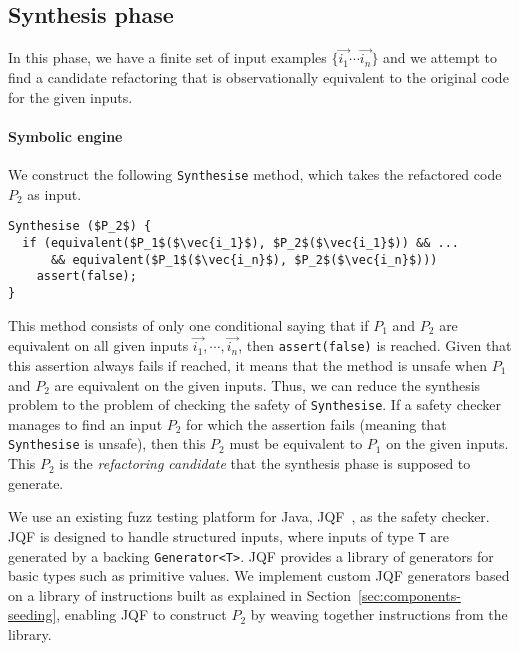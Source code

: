 \documentclass[conference]{IEEEtran}
\begin{document}

\subsection{Synthesis phase}\label{sec:synthesis}
In this phase, we have 
a finite set of input examples $\{\vec{i_1} \cdots \vec{i_n}\}$ and we attempt to find a candidate refactoring
that is observationally equivalent to the original code for the given inputs.

\paragraph{Symbolic engine}
We construct the following \lstinline[breaklines=true]{Synthesise} method, which
takes the refactored code $P_2$ as input.

\begin{lstlisting}[mathescape=true,showstringspaces=false,numbers=none]
Synthesise ($P_2$) {
  if (equivalent($P_1$($\vec{i_1}$), $P_2$($\vec{i_1}$)) && ...
      && equivalent($P_1$($\vec{i_n}$), $P_2$($\vec{i_n}$)))
    assert(false);
}
\end{lstlisting}

This method consists of only one conditional saying that if $P_1$ and $P_2$ are equivalent on all given inputs $\vec{i_1}, \cdots, \vec{i_n}$, then \lstinline[breaklines=true]{assert(false)} is reached.
Given that this assertion always fails if reached, it means that the method is unsafe when $P_1$ and $P_2$ are equivalent on the given inputs.
Thus, we can reduce the synthesis problem to the problem of checking the safety of \lstinline[breaklines=true]{Synthesise}. If a safety checker manages to
find an input $P_2$ for which the assertion fails (meaning that \lstinline[breaklines=true]{Synthesise} is unsafe), then this $P_2$ must be equivalent to $P_1$ on the given inputs. This $P_2$ is the {\em refactoring candidate}
that the synthesis phase is supposed to generate.

We use an existing fuzz testing platform for Java, JQF~\cite{DBLP:conf/issta/PadhyeLS19},
as the safety checker. JQF is designed to handle structured inputs, where inputs of type \lstinline[breaklines=true]{T}
are generated by a backing \lstinline[breaklines=true]{Generator<T>}. JQF provides a library of
generators for basic types such as primitive values. We implement custom
JQF generators based on a library of instructions built as explained in Section~\ref{sec:components-seeding},
enabling JQF to construct $P_2$ by weaving together instructions from the library.
\end{document}
